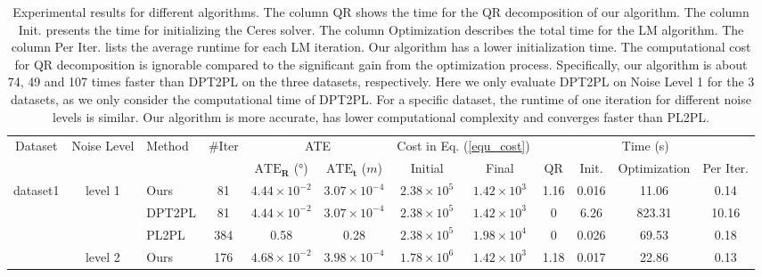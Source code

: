 \documentclass{vgtc}                          %
\begin{document}
\begin{table*}[tb]
	\caption{Experimental results for different algorithms.  The column  QR shows the  time for the QR decomposition of our algorithm. The column Init. presents the time for initializing the Ceres solver. The column Optimization describes the total time for the LM algorithm. The column Per Iter. lists the average runtime for each LM iteration. Our algorithm has a lower initialization time.  The computational cost for QR decomposition is ignorable  compared to the significant gain from the optimization process. Specifically, our algorithm is about 74, 49 and  107 times faster than DPT2PL on the three datasets, respectively. Here we only evaluate DPT2PL on Noise Level 1 for the 3 datasets, as we only consider  the computational time of DPT2PL. For a specific dataset,  the  runtime of one iteration for different  noise levels  is similar. Our algorithm is more accurate, has lower computational complexity and converges faster than PL2PL\cite{geneva2018lips}.} %
	\label{tab:results}
	\scriptsize%
	\centering%
	\begin{tabular}{ c | c l c  c c | c c | c c c c}
		\toprule
		\multirow{2}{*}{Dataset} & \multirow{2}{*}{Noise Level}  & \multirow{2}{*}{Method}  &   \multirow{2}{*}{\#Iter}   &  \multicolumn{2}{c}{ATE}  &  \multicolumn{2}{c}{ Cost in Eq. (\ref{equ_cost}) }  &  \multicolumn{4}{c}{Time (s)} \\ \cline{5-6} \cline{7-8} \cline{9-12}
		& & & &$\text{ATE}_{\mathbf{R}}$ (\si{\degree}) & $\text{ATE}_{\mathbf{t}}$ ($m$)& Initial  &  Final & QR &  Init.& Optimization & Per Iter.\\
		\hline
		\multirow{7}{*}{dataset1}  
		& \multirow{3}{*}{level 1} 
		& Ours & 81& $4.44 \times 10^{-2}$ &  $3.07 \times 10^{-4}$  &  $2.38 \times 10^5$ & $1.42 \times 10^3$ & 1.16 & 0.016 & 11.06 & 0.14\\
		&  &DPT2PL & 81 &  $4.44 \times 10^{-2}$ &  $3.07 \times 10^{-4}$  &  $2.38 \times 10^5$ & $1.42 \times 10^3$ & 0 & 6.26 & 823.31 &  10.16\\ 
		&  &PL2PL\cite{geneva2018lips} &  384 & 0.58  & 0.28 & $2.38 \times 10^5$ &$1.98 \times 10^4$ & 0 & 0.026 & 69.53 & 0.18\\  \cline{2-12}
		& \multirow{2}{*}{level 2} 
		& Ours & 176 & $4.68 \times 10^{-2}$ & $ 3.98 \times 10^{-4}$  &  $1.78 \times 10^6$ & $1.42 \times 10^3$ & 1.18 & 0.017 & 22.86 & 0.13  \\

\end{tabular}
\end{table*}
\end{document}
